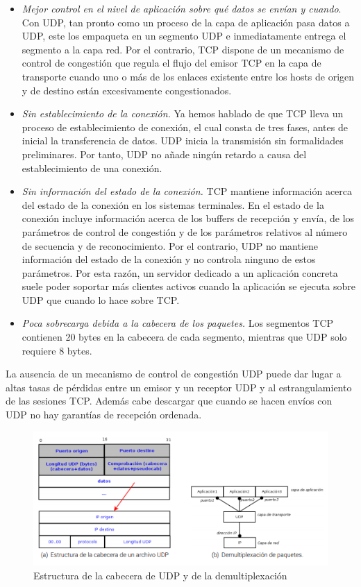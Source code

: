 \documentclass[a4paper,11pt]{article}
\begin{document}
\begin{itemize}
\item \textit{Mejor control en el nivel de aplicación sobre qué datos se envían y cuando}. Con UDP, tan pronto como un proceso de la capa de aplicación pasa datos a UDP, este los empaqueta en un segmento UDP e inmediatamente entrega el segmento a la capa red. Por el contrario, TCP dispone de un mecanismo de control de congestión que regula el flujo del emisor TCP en la capa de transporte cuando uno o más de los enlaces existente entre los hosts de origen y de destino están excesivamente congestionados.

\item \textit{Sin establecimiento de la conexión.} Ya hemos hablado de que TCP lleva un proceso de establecimiento de conexión, el cual consta de tres fases, antes de inicial la transferencia de datos. UDP inicia la transmisión sin formalidades preliminares. Por tanto, UDP no añade ningún retardo a causa del establecimiento de una conexión. 

\item \textit{Sin información del estado de la conexión.} TCP mantiene información acerca del estado de la conexión en los sistemas terminales. En el estado de la conexión incluye información acerca de los buffers de recepción y envía, de los parámetros de control de congestión y de los parámetros relativos al número de secuencia y de reconocimiento. Por el contrario, UDP no mantiene información del estado de la conexión y no controla ninguno de estos parámetros. Por esta razón, un servidor dedicado a un aplicación concreta suele poder soportar más clientes activos cuando la aplicación se ejecuta sobre UDP que cuando lo hace sobre TCP.

\item \textit{Poca sobrecarga debida a la cabecera de los paquetes.} Los segmentos TCP contienen 20 bytes en la cabecera de cada segmento, mientras que UDP solo requiere 8 bytes.
\end{itemize}

La ausencia de un mecanismo de control de congestión UDP puede dar lugar a altas tasas de pérdidas entre un emisor y un receptor UDP y al estrangulamiento de las sesiones TCP. Además cabe descargar que cuando se hacen envíos con UDP no hay garantías de recepción ordenada.

\begin{figure}[h]
\centering
\caption{Estructura de la cabecera de UDP y de la demultiplexación}
\includegraphics[scale=1,width=1.1\textwidth]{cabecera_udp.png}
\end{figure}
\end{document}
